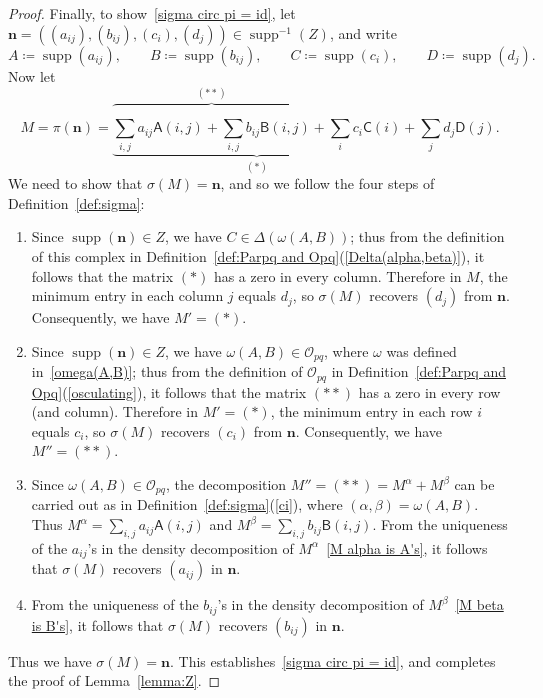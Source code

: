 \documentclass[noamsfonts,10pt]{amsart}
\newcommand{\al}{\alpha}
\newcommand{\be}{\beta}
\renewcommand{\O}{\mathcal{O}}
\DeclareMathOperator{\supp}{supp}
\newcommand{\sA}{\mathsf{A}}
\newcommand{\sB}{\mathsf{B}}
\newcommand{\sC}{\mathsf{C}}
\newcommand{\sD}{\mathsf{D}}
\newcommand{\1}{\mathbf{1}}
\theoremstyle{plain}
\theoremstyle{definition}
\numberwithin{equation}{section}
\begin{document}
\begin{proof}
    Finally, to show~\eqref{sigma circ pi = id}, let $\mathbf{n} = ((a_{ij}), (b_{ij}), (c_i), (d_j)) \in \supp^{-1}(Z)$, and write 
    \[ 
        A \coloneqq \supp(a_{ij}), \qquad 
        B \coloneqq \supp(b_{ij}), \qquad 
        C \coloneqq \supp(c_{i}), \qquad
        D \coloneqq \supp(d_{j}). 
    \]
    Now let
    \[
        M = \pi(\mathbf{n}) = \underbrace{\overbrace{\sum_{i,j}^{\phantom{*}} a_{ij} \sA(i,j) + \sum_{i,j} b_{ij} \sB(i,j)}^{(**)} + \sum_{i} c_{i} \sC(i)}_{(*)} + \sum_{j} d_{j} \sD(j).
    \]
    We need to show that $\sigma(M) = \mathbf{n}$, and so we follow the four steps of Definition~\ref{def:sigma}:
        \begin{enumerate}
            \item     Since $\supp(\mathbf{n}) \in Z$, we have $C \in \Delta(\omega(A,B))$;
            thus from the definition of this complex in Definition~\ref{def:Parpq and Opq}(\ref{Delta(alpha,beta)}), it follows that the matrix $(*)$ has a zero in every column.
            Therefore in $M$, the minimum entry in each column $j$ equals $d_j$, so $\sigma(M)$ recovers $(d_j)$ from $\mathbf{n}$.
            Consequently, we have $M' = (*)$.

            \item Since $\supp(\mathbf{n}) \in Z$, we have $\omega(A,B) \in \O_{pq}$, where $\omega$ was defined in~\eqref{omega(A,B)}; thus from the definition of $\O_{pq}$ in Definition~\ref{def:Parpq and Opq}(\ref{osculating}), it follows that the matrix $(**)$ has a zero in every row (and column).
            Therefore in $M' = (*)$, the minimum entry in each row $i$ equals $c_i$, so $\sigma(M)$ recovers $(c_i)$ from $\mathbf{n}$.
            Consequently, we have $M'' = (**)$.

            \item Since $\omega(A,B) \in \O_{pq}$, the decomposition $M'' = (**) = M^\al + M^\be$ can be carried out as in Definition~\ref{def:sigma}(\ref{ci}), where $(\al, \be) = \omega(A,B)$.
            Thus $M^\al = \sum_{i,j} a_{ij} \sA(i,j)$ and $M^\be = \sum_{i,j} b_{ij} \sB(i,j)$.
            From the uniqueness of the $a_{ij}$'s in the density decomposition of $M^\al$~\eqref{M alpha is A's}, it follows that $\sigma(M)$ recovers $(a_{ij})$ in $\mathbf{n}$.

            \item From the uniqueness of the $b_{ij}$'s in the density decomposition of $M^\be$~\eqref{M beta is B's}, it follows that $\sigma(M)$ recovers $(b_{ij})$ in $\mathbf{n}$.
        \end{enumerate}
        Thus we have $\sigma(M) = \mathbf{n}$.
        This establishes~\eqref{sigma circ pi = id}, and completes the proof of Lemma~\ref{lemma:Z}.
\end{proof}
\end{document}
